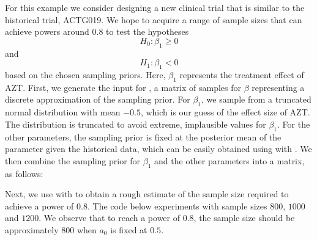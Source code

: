 For this example we consider designing a new clinical trial that is similar to the historical trial, ACTG019.  We hope to acquire a range of sample sizes that can achieve powers around $0.8$ to test the hypotheses $$H_0: \beta_1 \ge 0$$ and $$H_1: \beta_1 < 0$$ based on the chosen sampling priors. Here, $\beta_1$ represents the treatment effect of AZT. First, we generate the input for , a matrix of samples for $\beta$ representing a discrete approximation of the sampling prior. For $\beta_1$, we sample from a truncated normal distribution with mean $-0.5$, which is our guess of the effect size of AZT. The distribution is truncated to avoid extreme, implausible values for $\beta_1$. For the other parameters, the sampling prior is fixed at the posterior mean of the parameter given the historical data, which can be easily obtained using  with . We then combine the sampling prior for $\beta_1$ and the other parameters into a matrix, as follows:


Next, we use  with  to obtain a rough estimate of the sample size required to achieve a power of $0.8$. The code below experiments with sample sizes $800$, $1000$ and $1200$. We observe that to reach a power of $0.8$, the sample size should be approximately $800$ when $a_0$ is fixed at $0.5$.


